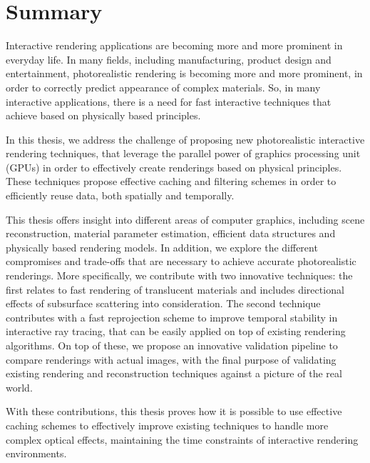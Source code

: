 \chapter{Summary}

Interactive rendering applications are becoming more and more prominent in everyday life. In many fields, including manufacturing, product design and entertainment, photorealistic rendering is becoming more and more prominent, in order to correctly predict appearance of complex materials. So, in many interactive applications, there is a need for fast interactive techniques that achieve based on physically based principles. 

In this thesis, we address the challenge of proposing new photorealistic interactive rendering techniques, that leverage the parallel power of graphics processing unit (GPUs) in order to effectively create renderings based on physical principles. These techniques propose effective caching and filtering schemes in order to efficiently reuse data, both spatially and temporally.     
 
This thesis offers insight into different areas of computer graphics, including scene reconstruction, material parameter estimation, efficient data structures and physically based rendering models. In addition, we explore the different compromises and trade-offs that are necessary to achieve accurate photorealistic renderings. More specifically, we contribute with two innovative techniques: the first relates to fast rendering of translucent materials and includes directional effects of subsurface scattering into consideration. The second technique contributes with a fast reprojection scheme to improve temporal stability in interactive ray tracing, that can be easily applied on top of existing rendering algorithms. On top of these, we propose an innovative validation pipeline to compare renderings with actual images, with the final purpose of validating existing rendering and reconstruction techniques against a picture of the real world. 

With these contributions, this thesis proves how it is possible to use effective caching schemes to effectively improve existing techniques to handle more complex optical effects, maintaining the time constraints of interactive rendering environments.